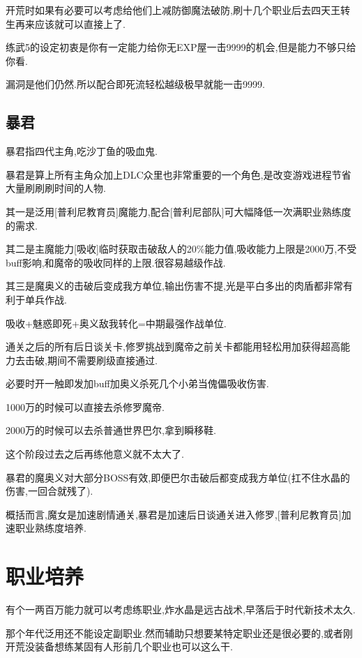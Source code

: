 	开荒时如果有必要可以考虑给他们上减防御魔法破防,刷十几个职业后去四天王转生再来应该就可以直接上了.

	练武5的设定初衷是你有一定能力给你无EXP屋一击9999的机会,但是能力不够只给你看.

	漏洞是他们仍然{\color{red}{吃即死}}.所以配合即死流轻松越级极早就能一击9999.

	\subsection{暴君}

	暴君指四代主角,吃沙丁鱼的吸血鬼.

	暴君是算上所有主角众加上DLC众里也非常重要的一个角色,是改变游戏进程节省大量刷刷刷时间的人物.

	其一是泛用[普利尼教育员]魔能力,配合[普利尼部队]可大幅降低一次满职业熟练度的需求.

	其二是主魔能力[吸收]临时获取击破敌人的20\%能力值,吸收能力上限是2000万,不受buff影响,和魔帝的吸收同样的上限.很容易越级作战.

	其三是魔奥义的击破后变成我方单位,输出伤害不提,光是平白多出的肉盾都非常有利于单兵作战.

	吸收+魅惑即死+奥义敌我转化=中期最强作战单位.

	通关之后的所有后日谈关卡,修罗挑战到魔帝之前关卡都能用轻松用{\color{red}{即死流}}加{\color{red}{暴君吸收}}获得超高能力去击破,期间不需要刷级直接通过.

	必要时开一触即发加buff加奥义杀死几个小弟当傀儡吸收伤害.

	1000万的时候可以直接去杀修罗魔帝.

	2000万的时候可以去杀普通世界巴尔,拿到瞬移鞋.

	这个阶段过去之后再练他意义就不太大了.

	暴君的魔奥义对大部分BOSS有效,即便巴尔击破后都变成我方单位(扛不住水晶的伤害,一回合就残了).

	概括而言,魔女是加速剧情通关,暴君是加速后日谈通关进入修罗,[普利尼教育员]加速职业熟练度培养.

\newpage

	\section{职业培养}

	有个一两百万能力就可以考虑练职业,炸水晶是远古战术,早落后于时代新技术太久.

	那个年代泛用还不能设定副职业.然而辅助只想要某特定职业还是很必要的,或者刚开荒没装备想练某固有人形前几个职业也可以这么干.

